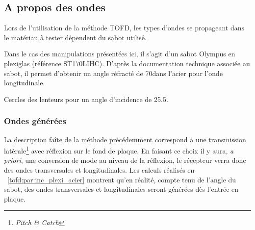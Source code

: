 \subsection{A propos des ondes}

Lors de l'utilisation de la méthode TOFD, les types d'ondes se propageant dans le matériau à tester dépendent du sabot utilisé.

Dans le cas des manipulations présentées ici, il s'agit d'un sabot Olympus en plexiglas
(référence ST170LIHC). D'après la documentation technique associée au sabot, il permet
d'obtenir un angle réfracté de 70\degres dans l'acier pour l'onde longitudinale.


\begin{figurehere}
    \centering
    \caption{Cercles des lenteurs pour un angle d'incidence de 25.5\degres.}
    \label{tofd:lenteurs}
\end{figurehere}

\subsubsection{Ondes générées}

La description faîte de la méthode précédemment correspond à une transmission
latérale\footnote{\textit{Pitch \& Catch}} avec réflexion sur le fond de plaque. En
faisant ce choix il y aura, \textit{a priori}, une conversion de mode au niveau de la
réflexion, le récepteur verra donc des ondes transversales et longitudinales.
Les calculs réalisés en ~\ref{tofd:par:inc_plexi_acier} montrent qu'en réalité, compte
tenu de l'angle du sabot, des ondes transversales et longitudinales seront générées dès
l'entrée en plaque.


